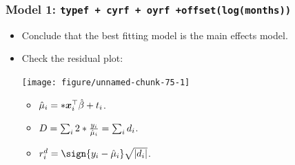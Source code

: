 \documentclass[oneside]{book}\usepackage[]{graphicx}\usepackage[svgnames]{xcolor}
\newenvironment{knitrout}{}{} %
\let\exp\relax%
\let\log\relax%
\DeclarePairedDelimiter\abs{\lvert}{\rvert}
\providecommand{\Vector}[1]{\bm{#1}}%
\begin{document}
\subsubsection*{Model 1: \texttt{typef + cyrf + oyrf +offset(log(months))}}
\begin{itemize}
      \item Conclude that the best fitting model is the main effects model.
      \item Check the residual plot:
\begin{knitrout}
\color{fgcolor}

{\centering \texttt{[image: figure/unnamed-chunk-75-1]} 

}


\end{knitrout}
            \begin{itemize}
                  \item $ \hat{\mu}_i=\exp*{\Vector{x}_i^\top \hat{\beta}+\log{t_i}} $.
                  \item $ D=\sum_{i}2\log*{\frac{y_i}{\hat{\mu}_i}}=\sum_i d_i $.
                  \item $ r_i^d=\sign{y_i-\hat{\mu}_i}\sqrt{\abs{d_i}} $.
            \end{itemize}
\end{itemize}
\end{document}
